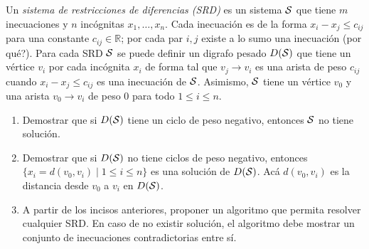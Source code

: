 
 \item Un \emph{sistema de restricciones de diferencias (SRD)} es un sistema ${\cal S}$ que tiene $m$ inecuaciones y $n$ incógnitas $x_1, \ldots, x_n$.  Cada inecuación es de la forma $x_i - x_j \leq c_{ij}$ para una constante $c_{ij} \in \mathbb{R}$; por cada par $i,j$ existe a lo sumo una inecuación (por qué?).  Para cada SRD ${\cal S}$ se puede definir un digrafo pesado $D({\cal S})$ que tiene un vértice $v_i$ por cada incógnita $x_i$ de forma tal que $v_j \to v_i$ es una arista de peso $c_{ij}$ cuando $x_i - x_j \leq c_{ij}$ es una inecuación de ${\cal S}$.  Asimismo, ${\cal S}$ tiene un vértice $v_0$ y una arista $v_0 \to v_i$ de peso $0$ para todo $1 \leq i \leq n$. \label{ej:SRD}

 \begin{enumerate}[label=$\alph*$.,ref=$\alph*$]
  \item Demostrar que si $D({\cal S})$ tiene un ciclo de peso negativo, entonces ${\cal S}$ no tiene solución.
  \item Demostrar que si $D({\cal S})$ no tiene ciclos de peso negativo, entonces $\{x_i = d(v_0, v_i) \mid 1 \leq i \leq n\}$ es una solución de $D({\cal S})$.  Acá $d(v_0, v_i)$ es la distancia desde $v_0$ a $v_i$ en $D({\cal S})$.
  \item A partir de los incisos anteriores, proponer un algoritmo que permita resolver cualquier SRD.  En caso de no existir solución, el algoritmo debe mostrar un conjunto de inecuaciones contradictorias entre sí.
 \end{enumerate}


